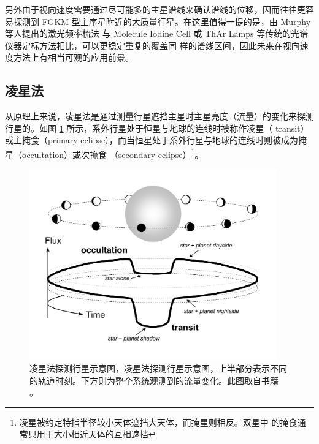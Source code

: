另外由于视向速度需要通过尽可能多的主星谱线来确认谱线的位移，因而往往更容易探测到 FGKM 
型主序星附近的大质量行星。在这里值得一提的是，由 Murphy 等人提出的激光频率梳法\cite{Murphyetal2007lasercomb}
与 Molecule Iodine Cell 或 ThAr Lamps 等传统的光谱仪器定标方法相比，可以更稳定重复的覆盖同
样的谱线区间，因此未来在视向速度方法上有相当可观的应用前景。


\subsection{凌星法}  \label{sec:transit}

从原理上来说，凌星法是通过测量行星遮挡主星时主星亮度（流量）的变化来探测行星的。如图
 \ref{fig:transit} 所示，系外行星处于恒星与地球的连线时被称作凌星（ transit）或主掩食（primary 
eclipse），而当恒星处于系外行星与地球的连线时则被成为掩星（occultation）或次掩食
（secondary eclipse）\footnote{凌星被约定特指半径较小天体遮挡大天体，而掩星则相反。双星中
的掩食通常只用于大小相近天体的互相遮挡}。

\begin{figure}[ht]
\centering
\includegraphics[width=0.95\textwidth,angle=-90, trim={0 1cm 0 0}, scale=0.9]{figures/chapter1/fig6_transit.pdf}
\caption[凌星法探测行星示意图，上半部分表示不同的轨道时刻。下方则为整个系统观测到的流量变化。版权 Joshua Winn。]{凌星法探测行星示意图，凌星法探测行星示意图，上半部分表示不同的轨道时刻。下方则为整个系统观测到的流量变化。此图取自书籍 。}
\label{fig:transit}
\end{figure}

